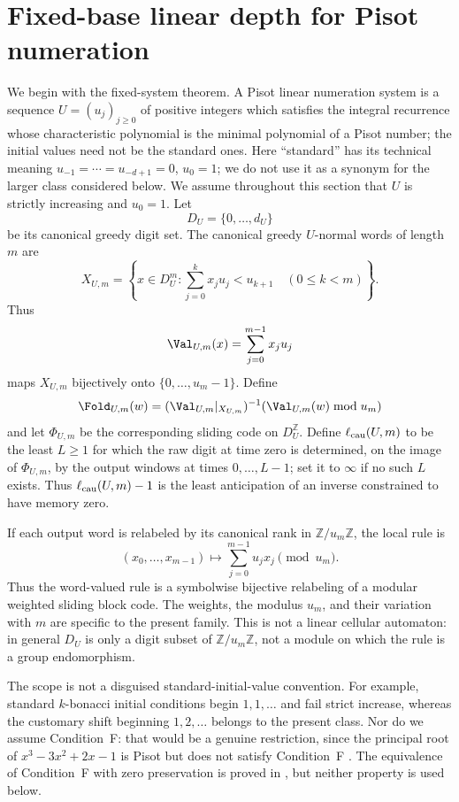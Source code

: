 \section{Fixed-base linear depth for Pisot numeration}
\label{sec:pisot-linear-depth}

We begin with the fixed-system theorem.  A Pisot linear numeration system is
a sequence $U=(u_j)_{j\ge0}$ of positive integers
which satisfies the integral recurrence whose characteristic polynomial is
the minimal polynomial of a Pisot number; the initial values need not be the
standard ones.  Here ``standard'' has its technical meaning
$u_{-1}=\cdots=u_{-d+1}=0$, $u_0=1$; we do not use it as a synonym for the
larger class considered below.  We assume throughout this section that $U$
is strictly increasing and $u_0=1$.  Let
\[
D_U=\{0,\ldots,d_U\}
\]
be its canonical greedy digit set.  The canonical greedy $U$-normal words of
length $m$ are
\begin{equation}
X_{U,m}=\left\{x\in D_U^m:
 \sum_{j=0}^k x_ju_j<u_{k+1}\quad(0\le k<m)\right\}.
\label{eq:pisot-canonical-words}
\end{equation}
Thus
\[
\Val_{U,m}(x)=\sum_{j=0}^{m-1}x_ju_j
\]
maps $X_{U,m}$ bijectively onto $\{0,\ldots,u_m-1\}$.  Define
\begin{equation}
\Fold_{U,m}(w)=
(\Val_{U,m}|_{X_{U,m}})^{-1}
       (\Val_{U,m}(w)\bmod u_m)
\label{eq:pisot-canonical-fold}
\end{equation}
and let $\Phi_{U,m}$ be the corresponding sliding code on
$D_U^{\mathbb Z}$.  Define $\ell_{\rm cau}(U,m)$ to be the least $L\ge1$ for
which the raw digit at time zero is determined, on the image of
$\Phi_{U,m}$, by the output windows at times $0,\ldots,L-1$; set it to
$\infty$ if no such $L$ exists.  Thus $\ell_{\rm cau}(U,m)-1$ is the least
anticipation of an inverse constrained to have memory zero.

If each output word is relabeled by its canonical rank in
$\mathbb Z/u_m\mathbb Z$, the local rule is
\[
(x_0,\ldots,x_{m-1})\longmapsto
\sum_{j=0}^{m-1}u_jx_j\pmod {u_m}.
\]
Thus the word-valued rule is a symbolwise bijective relabeling of a modular
weighted sliding block code.  The weights, the modulus $u_m$, and their
variation with $m$ are specific to the present family.  This is not a linear
cellular automaton: in general $D_U$ is only a digit subset of
$\mathbb Z/u_m\mathbb Z$, not a module on which the rule is a group
endomorphism.

The scope is not a disguised standard-initial-value convention.  For
example, standard $k$-bonacci initial conditions begin $1,1,\ldots$ and fail
strict increase, whereas the customary shift beginning $1,2,\ldots$ belongs
to the present class.  Nor do we assume Condition~F: that would be a genuine
restriction, since the principal root of $x^3-3x^2+2x-1$ is Pisot but does
not satisfy Condition~F \cite[Theorem~3]{Akiyama2000}.  The equivalence of
Condition~F with zero preservation is proved in
\cite{CartonSudberyYassawi2026}, but neither property is used below.

